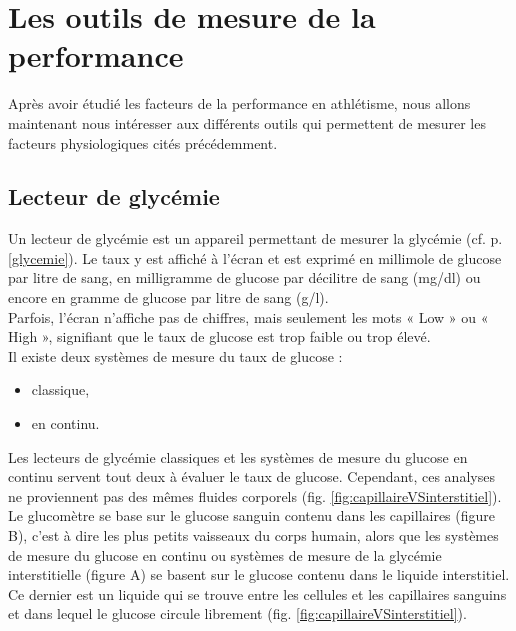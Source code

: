 \chapter{Les outils de mesure de la performance}
\label{part:outils}

Après avoir étudié les facteurs de la performance en athlétisme, nous allons maintenant nous intéresser aux différents outils qui permettent de mesurer les facteurs physiologiques cités précédemment. \\

    \section{Lecteur de glycémie}
    
    Un lecteur de glycémie est un appareil permettant de mesurer la glycémie (cf. p.\pageref{glycemie}  \ref{glycemie}). Le taux y est affiché à l’écran et est exprimé en millimole de glucose par litre de sang, en milligramme de glucose par décilitre de sang (mg/dl) ou encore en gramme de glucose par litre de sang (g/l). \\
    
    Parfois, l’écran n’affiche pas de chiffres, mais seulement les mots « Low » ou « High », signifiant que le taux de glucose est trop faible ou trop élevé.\\
    
    Il existe deux systèmes de mesure du taux de glucose : 
    \begin{itemize}
        \item classique,
        \item en continu.\\
    \end{itemize}
    
    Les lecteurs de glycémie classiques et les systèmes de mesure du glucose en continu servent tout deux à évaluer le taux de glucose. Cependant, ces analyses ne proviennent pas des mêmes fluides corporels (fig. \ref{fig:capillaireVSinterstitiel}).\\
    
    Le glucomètre se base sur le glucose sanguin contenu dans les capillaires (figure B), c'est à dire les plus petits vaisseaux du corps humain, alors que les systèmes de mesure du glucose en continu ou systèmes de mesure de la glycémie interstitielle (figure A) se basent sur le glucose contenu dans le liquide interstitiel. Ce dernier est un liquide qui se trouve entre les cellules et les capillaires sanguins et dans lequel le glucose circule librement (fig. \ref{fig:capillaireVSinterstitiel}).
    
